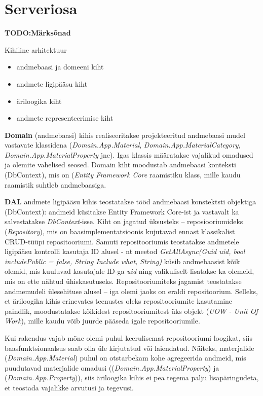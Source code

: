 \section{Serveriosa}

\textbf{TODO:Märksõnad}


Kihiline arhitektuur
\begin{itemize}
    \item andmebaasi ja domeeni kiht
    \item andmete ligipääsu kiht
    \item äriloogika kiht
    \item andmete representeerimise kiht
\end{itemize}

\textbf{Domain} (andmebaasi) kihis realiseeritakse projekteeritud andmebaasi mudel vastavate klassidena (\textit{Domain.App.Material},
\textit{Domain.App.MaterialCategory}, \textit{Domain.App.MaterialProperty} jne). Igas klassis määratakse vajalikud omadused ja
olemite vahelised seosed. Domain kiht moodustab andmebaasi konteksti (DbContext), mis on (\textit{Entity Framework Core} raamistiku klass,
mille kaudu raamistik suhtleb andmebaasiga.


\textbf{DAL} andmete ligipääsu kihis teostatakse tööd andmebaasi konstektsti objektiga (DbContext):  andmeid küsitakse Entity Framework Core-ist ja 
vastavalt ka salvestatakse \textit{DbContext}-isse. Kiht on jagatud üksusteks -- reposiooriumideks (\textit{Repository}), mis on 
baasimplementatsioonis kujutavad ennast klassikalist CRUD-tüüpi repositooriumi. Samuti repositooriumis 
teostatakse andmetele ligipääsu kontrolli kasutaja ID alusel -
nt meetod \textit{GetAllAsync(Guid uid, bool includePublic = false, String Include what, String)} küsib andmebaasist kõik olemid, 
mis kuuluvad kasutajale ID-ga \textit{uid} ning valikuliselt lisatakse ka olemeid, mis on ette nähtud ühiskasutuseks. 
Repositooriumiteks jagamist teostatakse andmemudeli ülesehituse alusel -- iga olemi jaoks on eraldi repositoorium. Selleks, et
äriloogika kihis erinevates teenustes oleks repositooriumite kasutamine paindlik, moodustatakse kõikidest repositooriumitest üks
objekt (\textit{UOW - Unit Of Work}), mille kaudu võib juurde pääseda igale repositooriumile.

Kui rakendus vajab mõne olemi puhul keerulisemat repositooriumi loogikat, siis baasfunktsionaalsus saab olla üle kirjutatud
või laiendatud. Näiteks, materjalide (\textit{Domain.App.Material}) puhul on otstarbekam kohe agregeerida andmeid, 
mis puudutavad materjalide omadusi ((\textit{Domain.App.MaterialProperty}) ja (\textit{Domain.App.Property})), siis
äriloogika kihis ei pea tegema palju lisapäringudeta, et teostada vajalikke arvutusi ja tegevusi.



